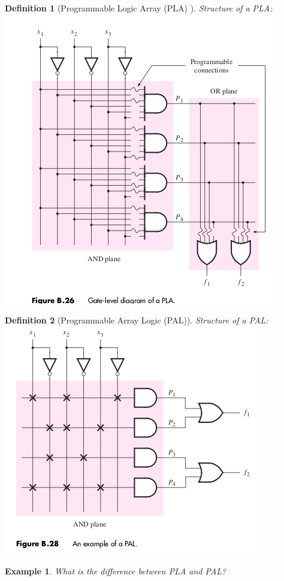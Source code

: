 \documentclass{article}
\newtheorem{example}{Example}
\newtheorem{definition}{Definition}
\begin{document}
\begin{definition}[Programmable Logic Array (PLA) ] Structure of a PLA:\\
  \includegraphics[width=0.7\linewidth]{./media/AND-OR-PLA.png}~\cite[Section~B.6.1]{stephen2022fundamentals}
\end{definition}

\begin{definition}[Programmable Array Logic (PAL)] Structure of a PAL:\\
  \includegraphics[width=0.7\linewidth]{./media/AND-OR-PAL.png}~\cite[Section~B.6.2]{stephen2022fundamentals}
\end{definition}

\begin{example}
  What is the difference between PLA and PAL?
\end{example}
\vspace{5em}
\end{document}
